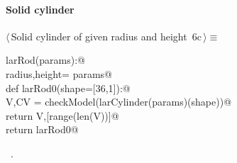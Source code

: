 \documentclass[11pt,oneside]{article}	%
\begin{document}
\paragraph{Solid cylinder}
\begin{flushleft} \small \label{scrap14}
\protect{}$\langle\,$Solid cylinder of given radius and height\nobreak\ {\footnotesize 6c}$\,\rangle\equiv$
\vspace{-1ex}
\begin{list}{}{} \item
\mbox{}\verb@def larRod(params):@\\
\mbox{}\verb@   radius,height= params@\\
\mbox{}\verb@   def larRod0(shape=[36,1]):@\\
\mbox{}\verb@      V,CV = checkModel(larCylinder(params)(shape))@\\
\mbox{}\verb@      return V,[range(len(V))]@\\
\mbox{}\verb@   return larRod0@\\
\mbox{}\verb@@{\NWsep}
\end{list}
\vspace{-1ex}
\footnotesize\addtolength{\baselineskip}{-1ex}
\begin{list}{}{\setlength{\itemsep}{-\parsep}\setlength{\itemindent}{-\leftmargin}}
\item \NWtxtMacroRefIn\ .
\end{list}
\end{flushleft}
\end{document}
